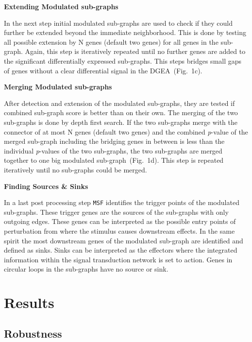 \documentclass[twocolumn]{article}
\begin{document}
\textbf{Extending Modulated sub-graphs}

In the next step initial modulated sub-graphs are used to check if
they could further be extended beyond the immediate neighborhood.
This is done by testing all possible extension by N genes (default two genes) for
all genes in the sub-graph. Again, this step is iteratively repeated until no
further genes are added to the significant differentially expressed
sub-graphs. This steps bridges small gaps of genes without a clear
differential signal in the DGEA~(Fig.~1c).\newline

\textbf{Merging Modulated sub-graphs}

After detection and extension of the modulated sub-graphs, they are
tested if combined sub-graph score is better than on their own. The merging of the two sub-graphs is done by depth first search. If the two sub-graphs merge with the connector of at most N genes (default two genes) and the
combined \textit{p}-value of the merged sub-graph including the
bridging genes in between is less than the individual
\textit{p}-values of the two sub-graphs, the two sub-graphs are merged
together to one big modulated sub-graph~(Fig.~1d). This step is repeated iteratively until no sub-graphs could be merged.\newline

\textbf{Finding Sources \& Sinks}

In a last post processing step \texttt{MSF} identifies the trigger
points of the modulated sub-graphs. These trigger genes are the sources
of the sub-graphs with only outgoing edges. These genes can be
interpreted as the possible entry points of perturbation from where the
stimulus causes downstream effects. In the same spirit the most
downstream genes of the modulated sub-graph are identified and defined
as sinks. Sinks can be interpreted as the effectors where the
integrated information within the signal transduction network is set
to action. Genes in circular loops in the sub-graphs have no source or sink.


\section*{Results}

\subsection*{Robustness}
\end{document}
